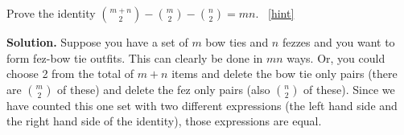 \documentclass{book}
\begin{document}
\setcounter{project}{95}
\addtocounter{project}{-1}
\begin{activity}[]\label{act-bowtiefez}
\hypertarget{p-721}{}%
Prove the identity \(\binom{m + n}{2} - \binom{m}{2} - \binom{n}{2} = mn\).%
~\hfill{\tiny\hyperlink{a-95}{[hint]}\hypertarget{q-95}{}}\par\smallskip%
\noindent\textbf{Solution.}\hypertarget{solution-69}{}\quad%
\hypertarget{p-723}{}%
Suppose you have a set of \(m\) bow ties and \(n\) fezzes and you want to form fez-bow tie outfits. This can clearly be done in \(mn\) ways. Or, you could choose 2 from the total of \(m + n\) items and delete the bow tie only pairs (there are \(\binom{m}{2}\) of these) and delete the fez only pairs (also \(\binom{n}{2}\) of these). Since we have counted this one set with two different expressions (the left hand side and the right hand side of the identity), those expressions are equal.%
\end{activity}
\end{document}
